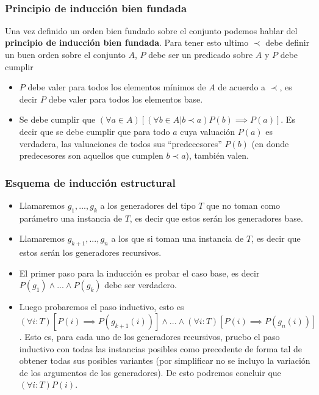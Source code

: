 \documentclass[10pt, a4paper]{report}
\begin{document}
~

\subsubsection{Principio de inducci\'on bien fundada}

Una vez definido un orden bien fundado sobre el conjunto podemos hablar del \textbf{principio de inducci\'on bien fundada}. Para tener esto ultimo $\prec$ debe definir un buen orden sobre el conjunto $A$, $P$ debe ser un predicado sobre $A$ y $P$ debe cumplir

\begin{itemize}
 \item $P$ debe valer para todos los elementos m\'inimos de $A$ de acuerdo a $\prec$, es decir $P$ debe valer para todos los elementos base.
 \item Se debe cumplir que $(\forall a\in A)[(\forall b \in A | b \prec a) P(b) \implies P(a)]$. Es decir que se debe cumplir que para todo $a$ cuya valuaci\'on $P(a)$ es verdadera, las valuaciones de todos sus ``predecesores'' $P(b)$ (en donde predecesores son aquellos que cumplen $b \prec a$), tambi\'en valen.
\end{itemize}


\subsubsection{Esquema de inducci\'on estructural}

\begin{itemize}
 \item Llamaremos $g_1,...,g_k$ a los generadores del tipo $T$ que no toman como par\'ametro una instancia de $T$, es decir que estos ser\'an los generadores base.
 \item Llamaremos $g_{k+1},...,g_n$ a los que si toman una instancia de $T$, es decir que estos ser\'an los generadores recursivos.
 \item El primer paso para la inducci\'on es probar el caso base, es decir $P(g_1) \land ... \land P(g_k)$ debe ser verdadero.
 \item Luego probaremos el paso inductivo, esto es $(\forall i : T) [P(i) \implies P(g_{k+1}(i))] \land ... \land (\forall i : T) [P(i) \implies P(g_{n}(i))]$. Esto es, para cada uno de los generadores recursivos, pruebo el paso inductivo con todas las instancias posibles como precedente de forma tal de obtener todas sus posibles variantes (por simplificar no se incluyo la variaci\'on de los argumentos de los generadores). De esto podremos concluir que $(\forall i : T) P(i)$.
\end{itemize}
\end{document}
